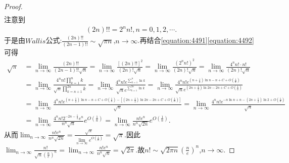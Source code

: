 \documentclass[../../main.tex]{subfiles}
\begin{document}
\begin{proof}
\begin{align}
\end{align}
注意到
\begin{align}\label{equation:4492}
(2n)!! = 2^n n!, n = 0,1,2,\cdots.
\end{align}
于是由\(Wallis\)公式:\(\frac{(2n)!!}{(2n - 1)!!}\sim\sqrt{\pi n}\),\(n\rightarrow\infty\).再结合\eqref{equation:4491}\eqref{equation:4492}可得
\begin{align*}
\sqrt{\pi}&=\underset{n\rightarrow \infty}{\lim}\frac{\left( 2n \right) !!}{\left( 2n-1 \right) !!\sqrt{n}}=\underset{n\rightarrow \infty}{\lim}\frac{\left[ \left( 2n \right) !! \right] ^2}{\left( 2n \right) !\sqrt{n}}=\underset{n\rightarrow \infty}{\lim}\frac{\left( 2^nn! \right) ^2}{\left( 2n \right) !\sqrt{n}}=\underset{n\rightarrow \infty}{\lim}\frac{4^nn!\cdot n!}{\left( 2n \right) !\sqrt{n}}
\\
&=\underset{n\rightarrow \infty}{\lim}\frac{4^nn!\prod\limits_{k=1}^n{k}}{\sqrt{n}\prod\limits_{k=n+1}^{2n}{k}}=\underset{n\rightarrow \infty}{\lim}\frac{4^nn!e^{\sum\limits_{k=1}^n{\ln k}}}{\sqrt{n}e^{\sum\limits_{k=1}^{2n}{\ln k}}}=\underset{n\rightarrow \infty}{\lim}\frac{4^nn!e^{\left( n+\frac{1}{2} \right) \ln n-n+C+O\left( \frac{1}{n} \right)}}{\sqrt{n}e^{\left( 2n+\frac{1}{2} \right) \ln 2n-2n+C+O\left( \frac{1}{n} \right)}}
\\
&=\underset{n\rightarrow \infty}{\lim}\frac{4^nn!e^{\left( n+\frac{1}{2} \right) \ln n-n+C+O\left( \frac{1}{n} \right) -\left[ \left( 2n+\frac{1}{2} \right) \ln 2n-2n+C+O\left( \frac{1}{n} \right) \right]}}{\sqrt{n}}=\underset{n\rightarrow \infty}{\lim}\frac{4^nn!e^{-n\ln n+n-\left( 2n+\frac{1}{2} \right) \ln 2+O\left( \frac{1}{n} \right)}}{\sqrt{n}}
\\
&=\underset{n\rightarrow \infty}{\lim}\frac{4^nn!2^{-2n-\frac{1}{2}}e^n}{n^n\sqrt{n}}e^{O\left( \frac{1}{n} \right)}=\underset{n\rightarrow \infty}{\lim}\frac{n!e^n}{n^n\sqrt{2n}}e^{O\left( \frac{1}{n} \right)}.
\end{align*}
从而\(\lim_{n\rightarrow\infty}\frac{n!e^n}{n^n\sqrt{2n}}=\frac{\sqrt{\pi}}{\lim\limits_{n\rightarrow\infty}e^{O\left(\frac{1}{n}\right)}}=\sqrt{\pi}\).因此\(\lim_{n\rightarrow\infty}\frac{n!}{\sqrt{n}\left(\frac{n}{e}\right)^n}=\lim_{n\rightarrow\infty}\frac{n!e^n}{n^n\sqrt{n}}=\sqrt{2\pi}\).故\(n!\sim\sqrt{2\pi n}\left(\frac{n}{e}\right)^n\),\(n\rightarrow\infty\).
\end{proof}
\end{document}
